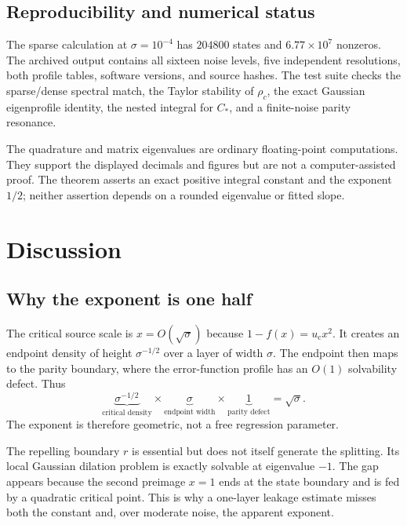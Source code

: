 \documentclass[11pt]{article}
\theoremstyle{definition}
\theoremstyle{remark}
\newcommand{\uc}{u_{\mathrm c}}
\begin{document}
\subsection{Reproducibility and numerical status}

The sparse calculation at $\sigma=10^{-4}$ has $204800$ states and
$6.77\times10^7$ nonzeros.  The archived output contains all sixteen noise
levels, five independent resolutions, both profile tables, software versions,
and source hashes.  The test suite checks the sparse/dense spectral match, the
Taylor stability of $\rho_c$, the exact Gaussian eigenprofile identity, the
nested integral for $C_*$, and a finite-noise parity resonance.

The quadrature and matrix eigenvalues are ordinary floating-point
computations.  They support the displayed decimals and figures but are not a
computer-assisted proof.  The theorem asserts an exact positive integral
constant and the exponent $1/2$; neither assertion depends on a rounded
eigenvalue or fitted slope.

\section{Discussion}
\label{sec:discussion}

\subsection{Why the exponent is one half}

The critical source scale is $x=O(\sqrt\sigma)$ because
$1-f(x)=\uc x^2$.  It creates an endpoint density of height
$\sigma^{-1/2}$ over a layer of width $\sigma$.  The endpoint then maps to
the parity boundary, where the error-function profile has an $O(1)$
solvability defect.  Thus
\begin{equation}\label{eq:dimensional-balance}
 \underbrace{\sigma^{-1/2}}_{\text{critical density}}
 \times
 \underbrace{\sigma}_{\text{endpoint width}}
 \times
 \underbrace{1}_{\text{parity defect}}
 =\sqrt\sigma.
\end{equation}
The exponent is therefore geometric, not a free regression parameter.

The repelling boundary $r$ is essential but does not itself generate the
splitting.  Its local Gaussian dilation problem is exactly solvable at
eigenvalue $-1$.  The gap appears because the second preimage $x=1$ ends at
the state boundary and is fed by a quadratic critical point.  This is why a
one-layer leakage estimate misses both the constant and, over moderate noise,
the apparent exponent.
\end{document}
